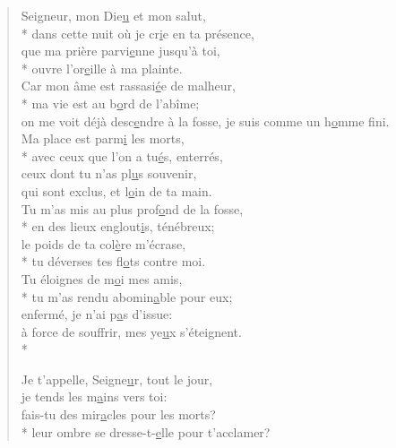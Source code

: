 
\begin{verse}
Seigneur, mon Die\underline{u} et mon salut, \\*
dans cette nuit où je cr\underline{i}e en ta présence, \\
que ma prière parvi\underline{e}nne jusqu’à toi, \\*
ouvre l’or\underline{e}ille à ma plainte. \\

Car mon âme est rassasi\underline{é}e de malheur, \\*
ma vie est au b\underline{o}rd de l’abîme; \\
on me voit déjà desc\underline{e}ndre à la fosse,\psalmstar
je suis comme un h\underline{o}mme fini. \\

Ma place est parm\underline{i} les morts, \\*
avec ceux que l’on a tu\underline{é}s, enterrés, \\
ceux dont tu n’as pl\underline{u}s souvenir, \\
qui sont exclus, et l\underline{o}in de ta main. \\

Tu m’as mis au plus prof\underline{o}nd de la fosse, \\*
en des lieux englout\underline{i}s, ténébreux; \\
le poids de ta col\underline{è}re m’écrase, \\*
tu déverses tes fl\underline{o}ts contre moi. \\

Tu éloignes de m\underline{o}i mes amis, \\*
tu m’as rendu abomin\underline{a}ble pour eux; \\
enfermé, je n’ai p\underline{a}s d’issue: \\
à force de souffrir, mes ye\underline{u}x s’éteignent. \\*

Je t’appelle, Seigne\underline{u}r, tout le jour, \\
je tends les m\underline{a}ins vers toi: \\
fais-tu des mir\underline{a}cles pour les morts? \\*
leur ombre se dresse-t-\underline{e}lle pour t’acclamer? \\


\end{verse}
